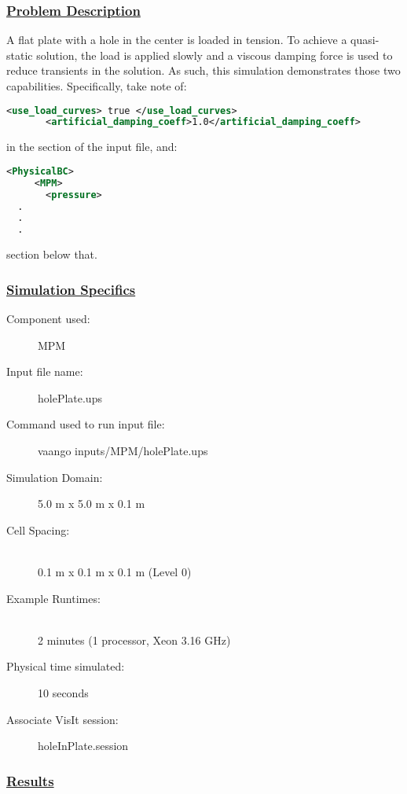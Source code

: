 \subsubsection*{\underline{Problem Description}}
A flat plate with a hole in the center is loaded in tension.  To achieve a
quasi-static solution, the load is applied slowly and a viscous damping force
is used to reduce transients in the solution.  As such, this simulation
demonstrates those two capabilities.  Specifically, take note of:
\begin{lstlisting}[language=XML]
       <use_load_curves> true </use_load_curves>
       <artificial_damping_coeff>1.0</artificial_damping_coeff>
\end{lstlisting}
in the  section of the input file, and:
\begin{lstlisting}[language=XML]
   <PhysicalBC>
     <MPM>
       <pressure>
  .
  .
  .
\end{lstlisting}
section below that.

 
\subsubsection*{\underline{Simulation Specifics}}
\begin{description} 
\item [Component used:] \hfill MPM
\item [Input file name:] \hfill holePlate.ups
\item [Command used to run input file:]\hfill vaango inputs/MPM/holePlate.ups
\item [Simulation Domain:]\hfill 5.0 m x 5.0 m x 0.1 m

\item [Cell Spacing:]\hfill \\ 
  0.1 m x 0.1 m x 0.1 m (Level 0)

\item [Example Runtimes:] \hfill \\
 2 minutes  (1 processor, Xeon 3.16 GHz)\\

\item [Physical time simulated:] \hfill 10 seconds

\item [Associate VisIt session:] \hfill holeInPlate.session

\end{description}

\subsubsection*{\underline{Results}}

